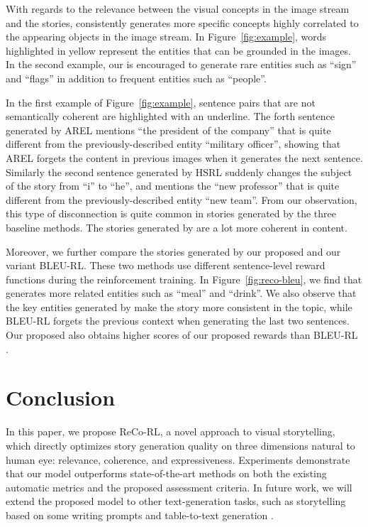 \documentclass[letterpaper]{article} \usepackage{aaai20}  \usepackage{times}  \usepackage{helvet} \usepackage{courier}  \usepackage[hyphens]{url}  \usepackage{graphicx} \urlstyle{rm} \def\UrlFont{\rm}  \usepackage{graphicx}  \frenchspacing  \setlength{\pdfpagewidth}{8.5in}  \setlength{\pdfpageheight}{11in}  \usepackage{times}
\newcommand{\bleu}{BLEU-RL }
\begin{document}
With regards to the relevance between the visual concepts in the image stream and the stories, \model consistently generates more specific concepts highly correlated to the appearing objects in the image stream. In Figure~\ref{fig:example}, words highlighted in yellow represent the entities that can be grounded in the images. In the second example, our \model is encouraged to generate rare entities such as ``sign'' and ``flags'' in addition to frequent entities such as ``people''.

In the first example of Figure~\ref{fig:example}, sentence pairs that are not semantically coherent are highlighted with an underline. The forth sentence generated by AREL mentions ``the president of the company'' that is quite different from the previously-described entity ``military officer'', showing that AREL forgets the content in previous images when it generates the next sentence. Similarly the second sentence generated by HSRL suddenly changes the subject of the story from ``i'' to ``he'', and mentions the ``new professor'' that is quite different from the previously-described entity ``new team''. From our observation, this type of disconnection is quite common in stories generated by the three baseline methods. The stories generated by \model are a lot more coherent in content.

Moreover, we further compare the stories generated by our proposed \model and our variant BLEU-RL. These two methods use different sentence-level reward functions during the reinforcement training. In Figure~\ref{fig:reco-bleu}, we find that \model generates more related entities such as ``meal'' and ``drink''. We also observe that the key entities generated by \model make the story more consistent in the topic, while \bleu forgets the previous context when generating the last two sentences. Our proposed \model also obtains higher scores of our proposed rewards than \bleu. 

\section{Conclusion}
In this paper, we propose ReCo-RL, a novel approach to visual storytelling, which directly optimizes story generation quality on three dimensions natural to human eye: relevance, coherence, and expressiveness. Experiments demonstrate that our model outperforms state-of-the-art methods on both the existing automatic metrics and the proposed assessment criteria. In future work, we will extend the proposed model to other text-generation tasks, such as storytelling based on some writing prompts \cite{li2019domian} and table-to-text generation \cite{table2text}. 
\end{document}
